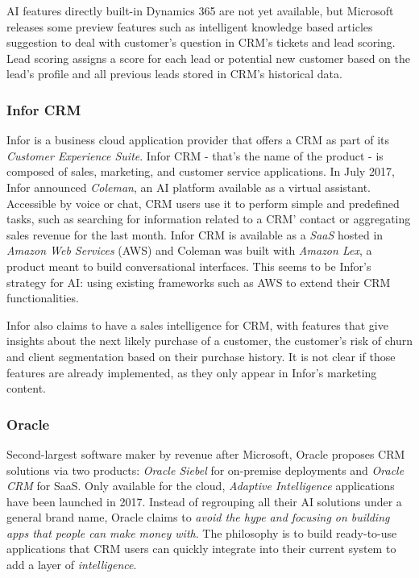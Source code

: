 AI features directly built-in Dynamics 365 are not yet available, but Microsoft releases some preview features such as intelligent knowledge based articles suggestion to deal with customer's question in CRM's tickets and lead scoring. Lead scoring assigns a score for each lead or potential new customer based on the lead's profile and all previous leads stored in CRM's historical data.

\subsubsection*{Infor CRM}
Infor is a business cloud application provider that offers a CRM as part of its \textit{Customer Experience Suite}. Infor CRM - that's the name of the product - is composed of sales, marketing, and customer service applications. In July 2017, Infor announced \textit{Coleman}, an AI platform available as a virtual assistant. Accessible by voice or chat, CRM users use it to perform simple and predefined tasks, such as searching for information related to a CRM' contact or aggregating sales revenue for the last month. Infor CRM is available as a \textit{SaaS} hosted in \textit{Amazon Web Services} (AWS) and Coleman was built with \textit{Amazon Lex}, a product meant to build conversational interfaces. This seems to be Infor's strategy for AI: using existing frameworks such as AWS to extend their CRM functionalities.

Infor also claims to have a sales intelligence for CRM, with features that give insights about the next likely purchase of a customer, the customer's risk of churn and client segmentation based on their purchase history. It is not clear if those features are already implemented, as they only appear in Infor's marketing content.\nocite{infor-website}


\subsubsection*{Oracle}
Second-largest software maker by revenue after Microsoft, Oracle proposes CRM solutions via two products: \textit{Oracle Siebel} for on-premise deployments and \textit{Oracle CRM} for SaaS. Only available for the cloud, \textit{Adaptive Intelligence} applications have been launched in 2017. Instead of regrouping all their AI solutions under a general brand name, Oracle claims to \textit{avoid the hype and focusing on building apps that people can make money with}\cite{https://www.techemergence.com/crm-artificial-intelligence-trends-across-salesforce-oracle-sap/}. The philosophy is to build ready-to-use applications that CRM users can quickly integrate into their current system to add a layer of \textit{intelligence}.

